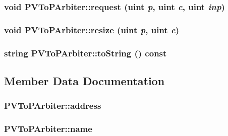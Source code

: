 \hypertarget{classPVToPArbiter_56e573c1e63d5016323e359c1f42468f}{
\subsubsection[{request}]{\setlength{\rightskip}{0pt plus 5cm}void PVToPArbiter::request ({\bf uint} {\em p}, \/  {\bf uint} {\em c}, \/  {\bf uint} {\em inp})}}
\label{classPVToPArbiter_56e573c1e63d5016323e359c1f42468f}


\hypertarget{classPVToPArbiter_bd33e2445fa794bdee2613d545b4f3bd}{
\subsubsection[{resize}]{\setlength{\rightskip}{0pt plus 5cm}void PVToPArbiter::resize ({\bf uint} {\em p}, \/  {\bf uint} {\em c})}}
\label{classPVToPArbiter_bd33e2445fa794bdee2613d545b4f3bd}


\hypertarget{classPVToPArbiter_8d61d75160f4350efc07d7783e31e19b}{
\subsubsection[{toString}]{\setlength{\rightskip}{0pt plus 5cm}string PVToPArbiter::toString () const}}
\label{classPVToPArbiter_8d61d75160f4350efc07d7783e31e19b}




\subsection{Member Data Documentation}
\hypertarget{classPVToPArbiter_5e6a19c3667836f9ccacaeb90bfb11d6}{
\subsubsection[{address}]{ {\bf PVToPArbiter::address}}}
\label{classPVToPArbiter_5e6a19c3667836f9ccacaeb90bfb11d6}


\hypertarget{classPVToPArbiter_8ce6c3bf97bae927e6a2f9b2e5aaaf0b}{
\subsubsection[{name}]{ {\bf PVToPArbiter::name}}}
\label{classPVToPArbiter_8ce6c3bf97bae927e6a2f9b2e5aaaf0b}


